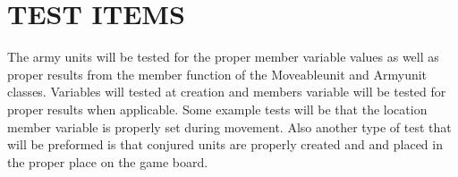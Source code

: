 \section[TEST ITEMS]{\bfseries\color{black} TEST ITEMS}

{\color{black}

The army units will be tested for the proper member variable values as well as proper results from the member function of the Moveableunit and Armyunit classes. Variables will tested at creation and members variable will be tested for proper results when applicable. Some example tests will be that the location member variable is properly set during movement. Also another type of test that will be preformed is that conjured units are properly created and and placed in the proper place on the game board. 
}

